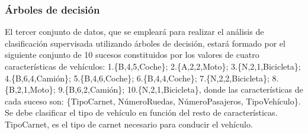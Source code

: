\documentclass[a4paper, 12pt]{article}
\begin{document}
	\subsubsection{Árboles de decisión}
	
	El tercer conjunto de datos, que se empleará para realizar el análisis de clasificación supervisada utilizando árboles de decisión, estará formado por el siguiente conjunto de 10 sucesos constituidos por los valores de cuatro características de vehículos: 1.\{B,4,5,Coche\}; 2.\{A,2,2,Moto\}; 3.\{N,2,1,Bicicleta\}; 4.\{B,6,4,Camión\}; 5.\{B,4,6,Coche\}; 6.\{B,4,4,Coche\}; 7.\{N,2,2,Bicicleta\}; 8.\{B,2,1,Moto\}; 9.\{B,6,2,Camión\}; 10.\{N,2,1,Bicicleta\}, donde las características de cada suceso son: \{TipoCarnet, NúmeroRuedas, NúmeroPasajeros, TipoVehículo\}. Se debe clasificar el tipo de vehículo en función del resto de características. TipoCarnet, es el tipo de carnet necesario para conducir el vehículo.
	
\end{document}

